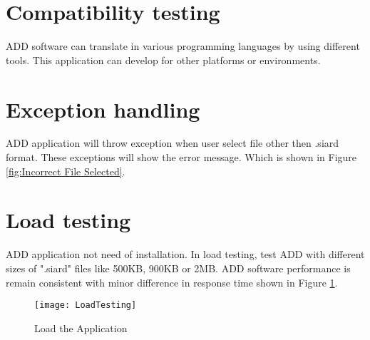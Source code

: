 	\section{Compatibility testing}
	ADD software can translate in various programming languages by using different tools. This application can develop for other platforms or environments.  
	
	 \section{Exception handling}
	ADD application will throw exception when user select file other then .siard format. These exceptions will show the error message. Which is shown in Figure \ref{fig:Incorrect File Selected}.
	
 \section{Load testing} 
	ADD application not need of installation. In load testing, test ADD with different sizes of ".siard" files like 500KB, 900KB or 2MB. ADD software performance is remain consistent with minor difference in response time shown in Figure \ref{fig:Load the Application}.
	\begin{figure}[ht]
\centering
\texttt{[image: LoadTesting]}
\caption{Load the Application}
\label{fig:Load the Application}
\end{figure}

